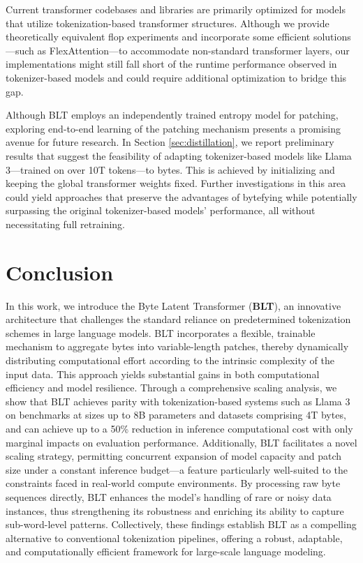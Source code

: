 Current transformer codebases and libraries are primarily optimized for models that utilize tokenization-based transformer structures. Although we provide theoretically equivalent flop experiments and incorporate some efficient solutions—such as FlexAttention—to accommodate non-standard transformer layers, our implementations might still fall short of the runtime performance observed in tokenizer-based models and could require additional optimization to bridge this gap.

Although {\textsc BLT} employs an independently trained entropy model for patching, exploring end-to-end learning of the patching mechanism presents a promising avenue for future research. In Section \ref{sec:distillation}, we report preliminary results that suggest the feasibility of adapting tokenizer-based models like Llama 3—trained on over 10T tokens—to bytes. This is achieved by initializing and keeping the global transformer weights fixed. Further investigations in this area could yield approaches that preserve the advantages of bytefying while potentially surpassing the original tokenizer-based models' performance, all without necessitating full retraining.

\section{Conclusion}
\label{section:conclusion}

In this work, we introduce the Byte Latent Transformer (\textbf{BLT}), an innovative architecture that challenges the standard reliance on predetermined tokenization schemes in large language models. BLT incorporates a flexible, trainable mechanism to aggregate bytes into variable-length patches, thereby dynamically distributing computational effort according to the intrinsic complexity of the input data. This approach yields substantial gains in both computational efficiency and model resilience. Through a comprehensive scaling analysis, we show that {\textsc BLT} achieves parity with tokenization-based systems such as Llama 3 on benchmarks at sizes up to 8B parameters and datasets comprising 4T bytes, and can achieve up to a 50\% reduction in inference computational cost with only marginal impacts on evaluation performance. Additionally, {\textsc BLT} facilitates a novel scaling strategy, permitting concurrent expansion of model capacity and patch size under a constant inference budget—a feature particularly well-suited to the constraints faced in real-world compute environments. By processing raw byte sequences directly, {\textsc BLT} enhances the model’s handling of rare or noisy data instances, thus strengthening its robustness and enriching its ability to capture sub-word-level patterns. Collectively, these findings establish {\textsc BLT} as a compelling alternative to conventional tokenization pipelines, offering a robust, adaptable, and computationally efficient framework for large-scale language modeling.

